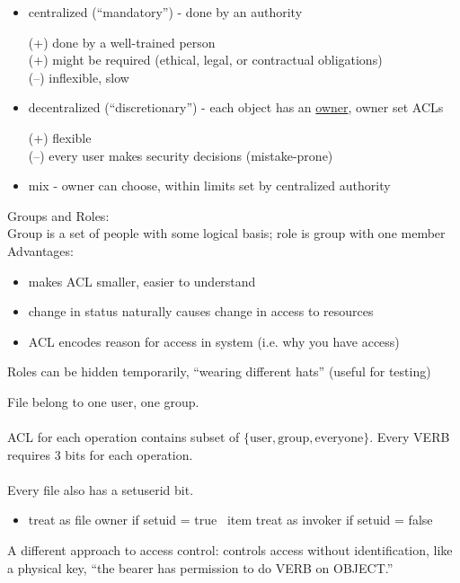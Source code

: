 \begin{itemize}
    \item centralized (``mandatory'') - done by an authority

    (+) done by a well-trained person\\
    (+) might be required (ethical, legal, or contractual obligations)\\
    (--) inflexible, slow
    \item decentralized (``discretionary'') - each object has an
    \underline{owner}, owner set ACLs

    (+) flexible\\
    (--) every user makes security decisions (mistake-prone)
    
    \item mix - owner can choose, within limits set by centralized authority
\end{itemize}
Groups and Roles:\\
Group is a set of people with some logical basis; role is group with one
member\\
Advantages:
\begin{itemize}
    \item makes ACL smaller, easier to understand
    \item change in status naturally causes change in access to resources
    \item ACL encodes reason for access in system (i.e. why you have access)
\end{itemize}
Roles can be hidden temporarily, ``wearing different hats'' (useful for testing)

File belong to one user, one group. 
\\
\\ ACL for each operation contains subset of $\{\text{user}, \text{group}, \text{everyone}\}$. Every VERB requires 3 bits for each operation. 
\\
\\
Every file also has a setuserid bit. 
\begin{itemize}
	\item treat as file owner if setuid = true
	\ item treat as invoker if setuid = false
\end{itemize}

A different approach to access control: controls access without identification,
like a physical key, ``the bearer has permission to do VERB on OBJECT.''

